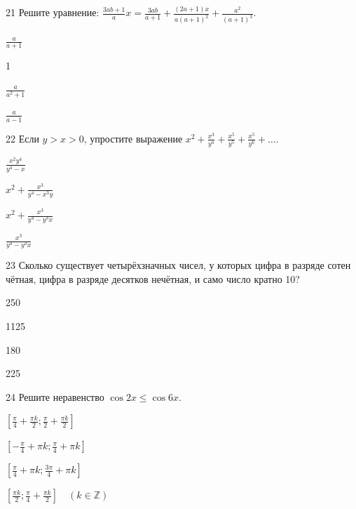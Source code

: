 \documentclass[14pt]{article}
\begin{document}
\begin{questionbox}{21}
    Решите уравнение: \(\frac{3ab+1}{a} x = \frac{3ab}{a+1} + \frac{(2a+1)x}{a(a+1)^2} + \frac{a^2}{(a+1)^3}\).
    \begin{options}
        \item \(\frac{a}{a+1}\)
        \item 1
        \item \(\frac{a}{a^2+1}\)
        \item \(\frac{a}{a-1}\)
    \end{options}
\end{questionbox}



\begin{questionbox}{22}
    Если \(y > x > 0\), упростите выражение \(x^2 + \frac{x^3}{y^4} + \frac{x^5}{y^5} + \frac{x^5}{y^6} + \dots\).
    \begin{options}
        \item \(\frac{x^2y^4}{y^4-x}\)
        \item \(x^2 + \frac{x^3}{y^4-x^3y}\)
        \item \(x^2 + \frac{x^3}{y^4-y^3x}\)
        \item \(\frac{x^3}{y^4-y^3x}\)
    \end{options}
\end{questionbox}



\begin{questionbox}{23}
    Сколько существует четырёхзначных чисел, у которых цифра в разряде сотен чётная, цифра в разряде десятков нечётная, и само число кратно 10?
    \begin{options}
        \item 250
        \item 1125
        \item 180
        \item 225
    \end{options}
\end{questionbox}



\begin{questionbox}{24}
    Решите неравенство \(\cos 2x \leq \cos 6x\).
    \begin{options}
        \item \(\left[\frac{\pi}{4} + \frac{\pi k}{2}; \frac{\pi}{2} + \frac{\pi k}{2}\right]\)
        \item \(\left[-\frac{\pi}{4} + \pi k; \frac{\pi}{4} + \pi k\right]\)
        \item \(\left[\frac{\pi}{4} + \pi k; \frac{3\pi}{4} + \pi k\right]\)
        \item \(\left[\frac{\pi k}{2}; \frac{\pi}{4} + \frac{\pi k}{2}\right] \quad (k \in \mathbb{Z})\)
    \end{options}
\end{questionbox}
\end{document}
